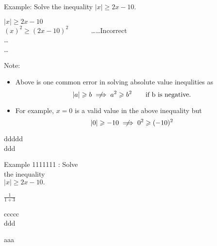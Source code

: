 \begin{tcbraster}[raster equal height,
enhanced,
title=tolorbox ABC  \thetcbrasternum]
\begin{tcolorbox}    
    Example: Solve the inequality $ \lvert x \rvert \geqslant 2x-10. $

\begin{warningEnv}
     $ \lvert x \rvert \geqslant 2x-10 $ \\
     $ (x)^2 \geqslant (2x-10)^2 \quad \quad \quad $ \dots \dots Incorrect \\
     \dots \\
     \dots     
\end{warningEnv}

 


Note:
\begin{itemize}
       \item[] Above is one common error in solving absolute value inequlities as 
                \[    \lvert a \rvert \geqslant b       \centernot\implies     a^2 \geqslant b^2  \quad  \quad \text{if b is negative.} \]    
    
      \item[]  For example, $x=0$ is a valid value in the above inequality but
                \[     \lvert 0 \rvert \geqslant -10       \centernot\implies     0^2 \geqslant (-10)^2 \] 
\end{itemize}






    
\end{tcolorbox}

\begin{tcolorbox}    
 ddddd\\
 
 ddd
 
    Example 1111111  : Solve
    \\
    the inequality \\
    $ \lvert x \rvert \geqslant 2x-10. $



$\frac{1}{1+3}$
\end{tcolorbox} \begin{tcolorbox}
  ccccc\\
  ddd
  
\end{tcolorbox}

\begin{tcolorbox}aaa \end{tcolorbox}

\end{tcbraster}


